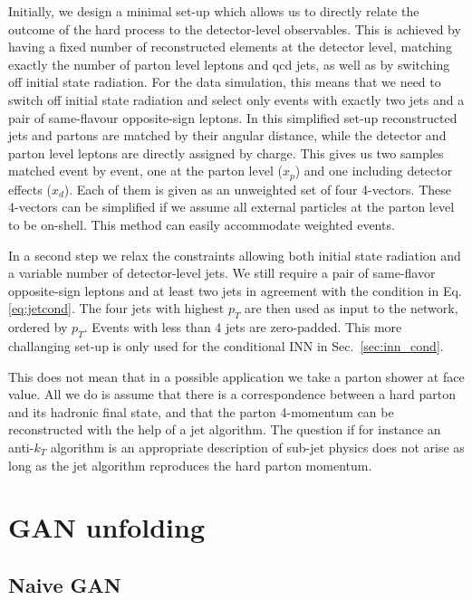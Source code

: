 Initially, we design a minimal set-up which allows us to 
directly relate the outcome of the hard process to the detector-level
observables.
This is achieved by having a fixed number of reconstructed elements 
at the detector level, matching exactly the number of parton level leptons
and qcd jets, as well as by switching off initial state radiation.
For the data simulation, this means that we need to switch off initial 
state radiation and select only events with exactly two jets and a 
pair of same-flavour opposite-sign leptons. 
In this simplified set-up reconstructed jets and partons are matched by
their angular distance, while the detector and parton level leptons are
directly assigned by charge. This gives us two samples matched event by event,
one at the parton level ($x_p$) and one including detector effects
($x_d$).  
Each of them is given as an unweighted set of four 4-vectors. 
These 4-vectors can be simplified if we assume all external
particles at the parton level to be on-shell. This method can easily 
accommodate weighted events.

In a second step we relax the constraints allowing both initial state
radiation and a variable number of detector-level jets.
We still require a pair of same-flavor opposite-sign leptons and 
at least two jets in agreement with the condition in Eq.\eqref{eq:jetcond}. 
The four jets with highest $p_T$ are then used as input to the network, ordered by
$p_T$. Events with less than 4 jets are zero-padded. This more challanging set-up 
is only used for the conditional INN in Sec.~\ref{sec:inn_cond}.

This does not mean that in a possible application we take a
parton shower at face value. All we do is assume that there is a
correspondence between a hard parton and its hadronic final state, and
that the parton 4-momentum can be reconstructed with the help of a jet
algorithm. The question if for instance an anti-$k_T$ algorithm is an
appropriate description of sub-jet physics does not arise as long as
the jet algorithm reproduces the hard parton momentum.


\section{GAN unfolding}\label{sec:ganunfolding}

\subsection{Naive GAN}

